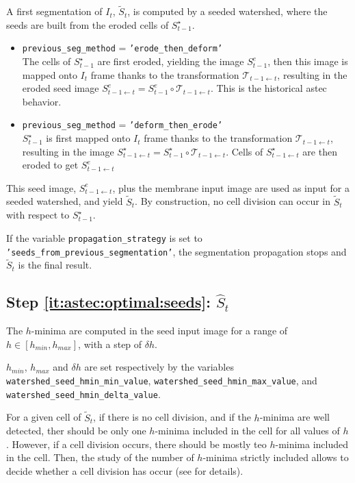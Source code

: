 A first segmentation of $I_{t}$, $\tilde{S}_{t}$, is computed by a seeded watershed, where the seeds are built from the eroded cells of $S^\star_{t-1}$.
\begin{itemize}
\item \texttt{previous\_seg\_method} = \texttt{'erode\_then\_deform'} 
  \mbox{} \\
  The cells of $S^\star_{t-1}$ are first eroded, yielding the image $S^e_{t-1}$, then this image is mapped onto $I_{t}$ frame thanks to the transformation $\mathcal{T}_{t-1 \leftarrow t}$, resulting in the eroded seed image $S^e_{t-1 \leftarrow t} = S^e_{t-1} \circ \mathcal{T}_{t-1 \leftarrow t}$. This is the historical astec behavior.
\item \texttt{previous\_seg\_method} = \texttt{'deform\_then\_erode'} 
  \mbox{} \\ 
  $S^\star_{t-1}$ is first mapped onto $I_{t}$ frame thanks to the transformation $\mathcal{T}_{t-1 \leftarrow t}$, resulting in the image $S^\star_{t-1 \leftarrow t} = S^\star_{t-1} \circ \mathcal{T}_{t-1 \leftarrow t}$. Cells of $S^\star_{t-1 \leftarrow t}$ are then eroded to get $S^e_{t-1 \leftarrow t}$
\end{itemize}

This seed image, $S^e_{t-1 \leftarrow t}$, plus the membrane input image are used as input for a seeded watershed, and yield $\tilde{S}_{t}$. 
By construction, no cell division can occur in $\tilde{S}_{t}$ with respect to $S^\star_{t-1}$.

If the variable \texttt{propagation\_strategy} is set to 
\texttt{'seeds\_from\_previous\_segmentation'}, 
the segmentation propagation stops and $\tilde{S}_{t}$ is the final result. 


\subsection{Step \ref{it:astec:optimal:seeds}: $\hat{S}_{t}$}

The $h$-minima are computed in the seed input image for a range of $h \in [h_{min}, h_{max}]$, with a step of $\delta h$.

$h_{min}$, $h_{max}$ and $\delta h$ are set respectively by the variables
\texttt{watershed\_seed\_hmin\_min\_value},
\texttt{watershed\_seed\_hmin\_max\_value}, and
\texttt{watershed\_seed\_hmin\_delta\_value}.

For a given cell of $\tilde{S}_{t}$,
if there is no cell division, and if the $h$-minima are well detected, ther should be only one $h$-minima included in the cell for all values of $h$.
However, if a cell division occurs, there should be mostly teo $h$-minima included in the cell. 
Then, 
the study of the number of $h$-minima strictly included allows to decide whether a cell division has occur (see \cite{guignard:tel-01278725,guignard:hal-02903409} for details).

